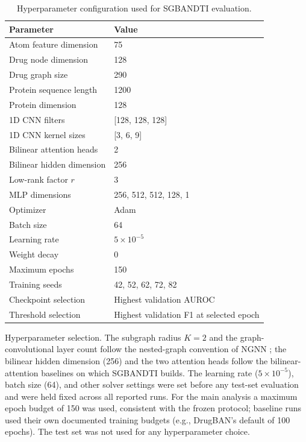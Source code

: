 \documentclass[computers,article,submit,moreauthors]{Definitions/mdpi}
\begin{document}
\begin{table}[H]
\caption{Hyperparameter configuration used for SGBANDTI evaluation.}
\label{tab:hyperparameter_config}
\begin{tabular*}{\textwidth}{@{\extracolsep{\fill}}ll@{}}
\toprule
\textbf{Parameter} & \textbf{Value} \\
\midrule
Atom feature dimension & 75 \\
Drug node dimension & 128 \\
Drug graph size & 290 \\
Protein sequence length & 1200 \\
Protein dimension & 128 \\
1D CNN filters & [128, 128, 128] \\
1D CNN kernel sizes & [3, 6, 9] \\
Bilinear attention heads & 2 \\
Bilinear hidden dimension & 256 \\
Low-rank factor $r$ & 3 \\
MLP dimensions & 256, 512, 512, 128, 1 \\
Optimizer & Adam \\
Batch size & 64 \\
Learning rate & $5 \times 10^{-5}$ \\
Weight decay & 0 \\
Maximum epochs & 150 \\
Training seeds & 42, 52, 62, 72, 82 \\
Checkpoint selection & Highest validation AUROC \\
Threshold selection & Highest validation F1 at selected epoch \\
\bottomrule
\end{tabular*}
\end{table}

Hyperparameter selection. The subgraph radius $K=2$ and the graph-convolutional layer count follow the nested-graph convention of NGNN \citep{zhang2021ngnn}; the bilinear hidden dimension (256) and the two attention heads follow the bilinear-attention baselines on which SGBANDTI builds. The learning rate ($5 \times 10^{-5}$), batch size (64), and other solver settings were set before any test-set evaluation and were held fixed across all reported runs. For the main analysis a maximum epoch budget of 150 was used, consistent with the frozen protocol; baseline runs used their own documented training budgets (e.g., DrugBAN's default of 100 epochs). The test set was not used for any hyperparameter choice.
\end{document}
